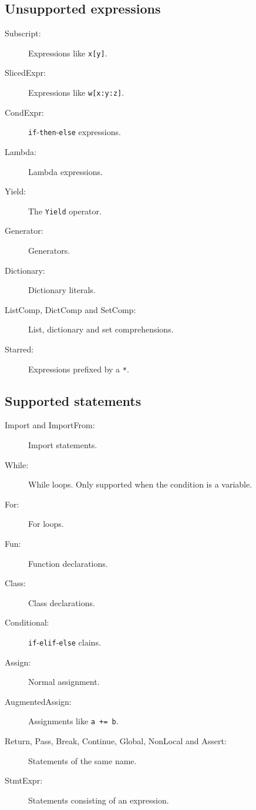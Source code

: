 \documentclass[11pt]{report}
\begin{document}
\subsection{Unsupported expressions}
\begin{description}
  \item[Subscript:] Expressions like \verb|x[y]|.
  \item[SlicedExpr:] Expressions like \verb|w[x:y:z]|.
  \item[CondExpr:] \verb|if|-\verb|then|-\verb|else| expressions.
  \item[Lambda:] Lambda expressions.
  \item[Yield:] The \verb|Yield| operator.
  \item[Generator:] Generators.
  \item[Dictionary:] Dictionary literals.
  \item[ListComp, DictComp and SetComp:] List, dictionary and set
    comprehensions.
  \item[Starred:] Expressions prefixed by a \verb|*|.
\end{description}

\subsection{Supported statements}
\begin{description}
  \item[Import and ImportFrom:] Import statements.
  \item[While:] While loops. Only supported when the condition is a variable.
  \item[For:] For loops.
  \item[Fun:] Function declarations.
  \item[Class:] Class declarations.
  \item[Conditional:] \verb|if|-\verb|elif|-\verb|else| clains.
  \item[Assign:] Normal assignment.
  \item[AugmentedAssign:] Assignments like \verb|a += b|.
  \item[Return, Pass, Break, Continue, Global, NonLocal and Assert:] Statements of the same name.
  \item[StmtExpr:] Statements consisting of an expression.
\end{description}
\end{document}

